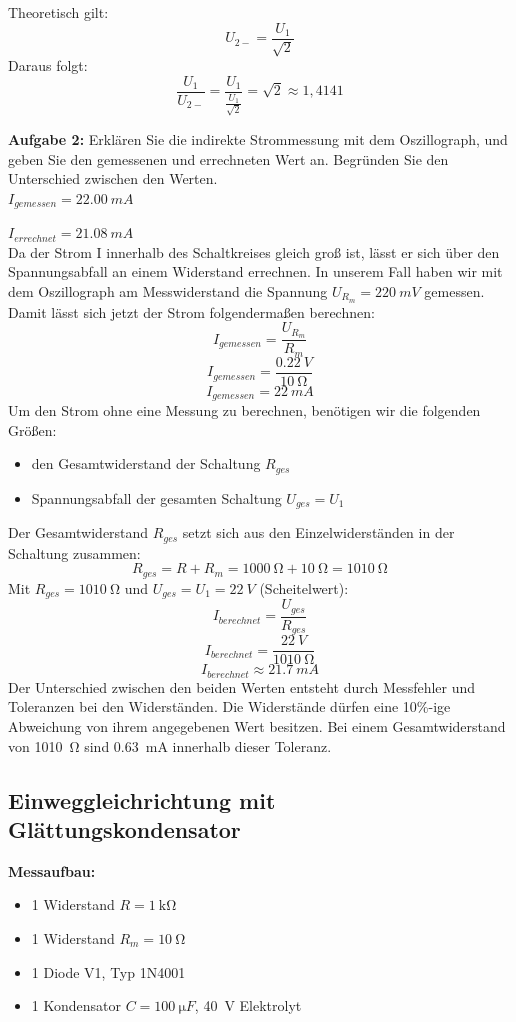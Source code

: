 \documentclass[a4paper, 11pt,oneside]{article}
\begin{document}
	Theoretisch gilt:
	$$ U_{2-}=\frac{U_{1}}{\sqrt{2}} $$
	Daraus folgt:
	$$ \frac{U_{1}}{U_{2-}}=\frac{U_{1}}{\frac{U_{1}}{\sqrt{2}}}=\sqrt{2}\approx1,4141 $$
	
	\textbf{Aufgabe 2:} Erklären Sie die indirekte Strommessung mit dem Oszillograph, und geben Sie den gemessenen und errechneten Wert an. Begründen Sie den Unterschied zwischen den Werten.\\
	
	$I_{gemessen}=\SI{22,00}{mA}$
	
	$I_{errechnet}=\SI{21,08}{mA}$\\
	
	Da der Strom I innerhalb des Schaltkreises gleich groß ist, lässt er sich über den Spannungsabfall an einem Widerstand errechnen. In unserem Fall haben wir mit dem Oszillograph am Messwiderstand die Spannung $U_{R_{m}}=\SI{220}{mV}$ gemessen. Damit lässt sich jetzt der Strom folgendermaßen berechnen:
	$$ I_{gemessen}=\frac{U_{R_{m}}}{R_{m}} $$
	$$ I_{gemessen}=\frac{\SI{0,22}{V}}{\SI{10}{\ohm}} $$ %
	$$ I_{gemessen}=\SI{22}{mA} $$
	Um den Strom ohne eine Messung zu berechnen, benötigen wir die folgenden Größen:
	\begin{itemize}
		\item den Gesamtwiderstand der Schaltung $R_{ges}$
		\item Spannungsabfall der gesamten Schaltung $U_{ges}=U_{1}$
	\end{itemize}
	Der Gesamtwiderstand $R_{ges}$ setzt sich aus den Einzelwiderständen in der Schaltung zusammen:
	$$ R_{ges}=R+R_{m}=\SI{1000}{\ohm} + \SI{10}{\ohm} = \SI{1010}{\ohm} $$
	Mit $R_{ges}=\SI{1010}{\ohm}$ und $U_{ges}=U_{1}=\SI{22}{V}$ (Scheitelwert):
	$$ I_{berechnet}=\frac{U_{ges}}{R_{ges}} $$
	$$ I_{berechnet}=\frac{\SI{22}{V}}{\SI{1010}{\ohm}} $$
	$$ I_{berechnet}\approx\SI{21,7}{mA} $$
	Der Unterschied zwischen den beiden Werten entsteht durch Messfehler und Toleranzen bei den Widerständen. Die Widerstände dürfen eine 10\%-ige Abweichung von ihrem angegebenen Wert besitzen. Bei einem Gesamtwiderstand von \SI{1010}{\ohm} sind \SI{0,63}{mA} innerhalb dieser Toleranz.
	
	\subsection{Einweggleichrichtung mit Glättungskondensator}
	
	\textbf{Messaufbau:}
	\begin{itemize}
		\item 1 Widerstand $R=\SI{1}{\kilo\ohm}$
		\item 1 Widerstand $R_{m}=\SI{10}{\ohm}$
		\item 1 Diode V1, Typ 1N4001
		\item 1 Kondensator $C=\SI{100}{\micro F}$, \SI{40}{V} Elektrolyt
	\end{itemize}
	
\end{document}
